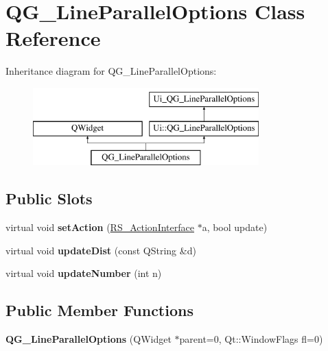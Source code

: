 \hypertarget{classQG__LineParallelOptions}{\section{Q\-G\-\_\-\-Line\-Parallel\-Options Class Reference}
\label{classQG__LineParallelOptions}
}
Inheritance diagram for Q\-G\-\_\-\-Line\-Parallel\-Options\-:\begin{figure}[H]
\begin{center}
\leavevmode
\includegraphics[height=3.000000cm]{classQG__LineParallelOptions}
\end{center}
\end{figure}
\subsection*{Public Slots}
\begin{DoxyCompactItemize}
\item 
\hypertarget{classQG__LineParallelOptions_a0cce1fa9663b843952f891951a6bccb9}{virtual void {\bfseries set\-Action} (\hyperlink{classRS__ActionInterface}{R\-S\-\_\-\-Action\-Interface} $\ast$a, bool update)}\label{classQG__LineParallelOptions_a0cce1fa9663b843952f891951a6bccb9}

\item 
\hypertarget{classQG__LineParallelOptions_a8bed1931fcad0b8b2a6940a97007abe4}{virtual void {\bfseries update\-Dist} (const Q\-String \&d)}\label{classQG__LineParallelOptions_a8bed1931fcad0b8b2a6940a97007abe4}

\item 
\hypertarget{classQG__LineParallelOptions_ae7c3db62f5269748a9531dfc29ba7b48}{virtual void {\bfseries update\-Number} (int n)}\label{classQG__LineParallelOptions_ae7c3db62f5269748a9531dfc29ba7b48}

\end{DoxyCompactItemize}
\subsection*{Public Member Functions}
\begin{DoxyCompactItemize}
\item 
\hypertarget{classQG__LineParallelOptions_a918f352df44a8d7aabeb48548a2a827c}{{\bfseries Q\-G\-\_\-\-Line\-Parallel\-Options} (Q\-Widget $\ast$parent=0, Qt\-::\-Window\-Flags fl=0)}\label{classQG__LineParallelOptions_a918f352df44a8d7aabeb48548a2a827c}

\end{DoxyCompactItemize}
